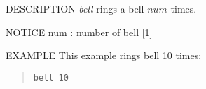\begin{synopsis}
\item[bell] [ $num$ ]
\end{synopsis}

\begin{qsection}{DESCRIPTION}
{\em bell} rings a bell $num$ times.
\end{qsection}

\begin{options}
\end{options}

\begin{qsection}{NOTICE}
num : number of bell      [1]
\end{qsection}

\begin{qsection}{EXAMPLE}
This example rings bell 10 times:
\begin{quote}
 \verb!bell 10!
\end{quote}
\end{qsection}
